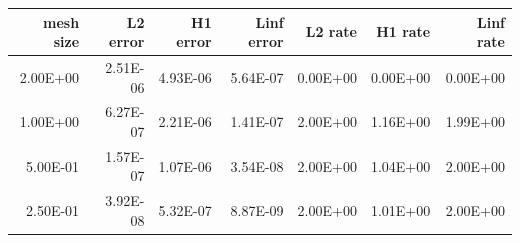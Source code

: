 \begin{tabular}{rrrrrrr}
\toprule
mesh size & L2 error & H1 error & Linf error & L2 rate & H1 rate & Linf rate \\
\midrule
2.00E+00 & 2.51E-06 & 4.93E-06 & 5.64E-07 & 0.00E+00 & 0.00E+00 & 0.00E+00 \\
1.00E+00 & 6.27E-07 & 2.21E-06 & 1.41E-07 & 2.00E+00 & 1.16E+00 & 1.99E+00 \\
5.00E-01 & 1.57E-07 & 1.07E-06 & 3.54E-08 & 2.00E+00 & 1.04E+00 & 2.00E+00 \\
2.50E-01 & 3.92E-08 & 5.32E-07 & 8.87E-09 & 2.00E+00 & 1.01E+00 & 2.00E+00 \\
\bottomrule
\end{tabular}
